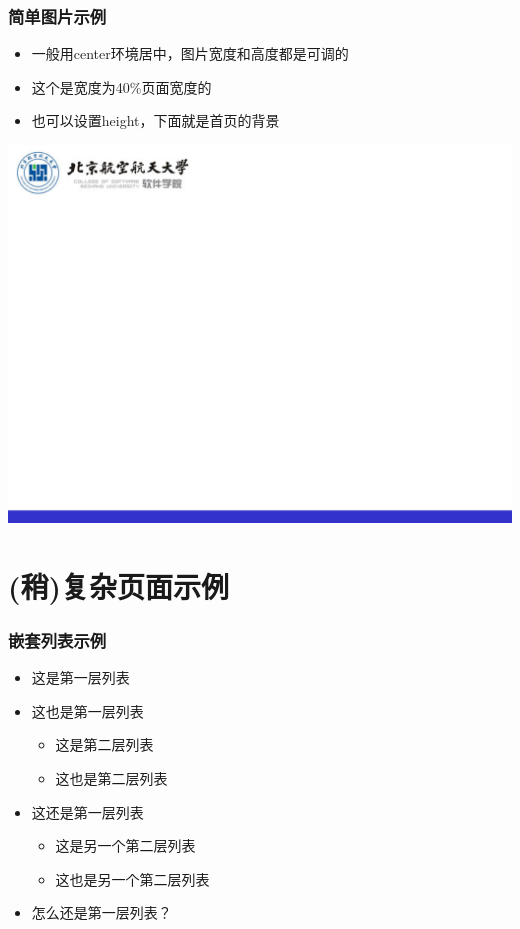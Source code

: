 \documentclass[17pt]{beamer}
\begin{document}
    \begin{frame}
        \frametitle{简单图片示例}
        \begin{itemize}
            \item 一般用center环境居中，图片宽度和高度都是可调的
            \item 这个是宽度为40\%页面宽度的
            \item 也可以设置height，下面就是首页的背景
        \end{itemize}
        \begin{center}
            \includegraphics[width=.4\paperwidth]{pic/bg1.png}
        \end{center}
    \end{frame}

    \section{(稍)复杂页面示例} 
    
    \begin{frame}
        \frametitle{嵌套列表示例}

        \begin{itemize}
            \item 这是第一层列表
            \item 这也是第一层列表
            \begin{itemize} 
                \item 这是第二层列表
                \item 这也是第二层列表
            \end{itemize}
            \item 这还是第一层列表
            \begin{itemize}
                \item 这是另一个第二层列表
                \item 这也是另一个第二层列表
            \end{itemize}
            \item 怎么还是第一层列表？
        \end{itemize}
    \end{frame}
\end{document}
